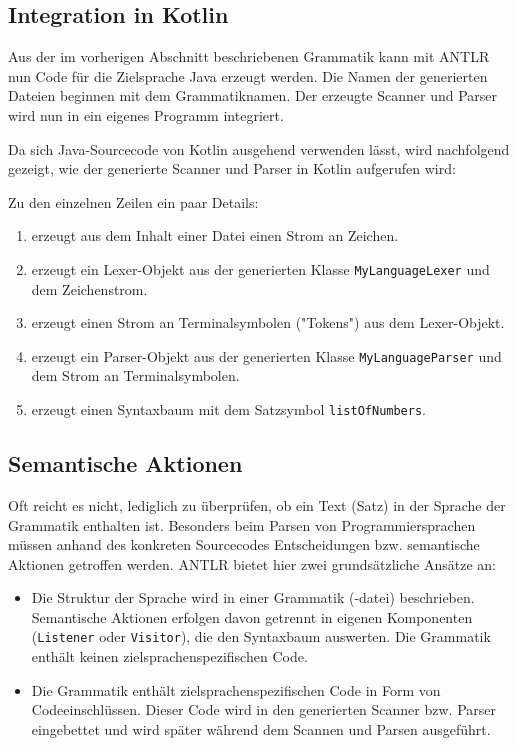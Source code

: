\subsection{Integration in Kotlin}

Aus der im vorherigen Abschnitt beschriebenen Grammatik kann mit ANTLR nun Code für die Zielsprache Java erzeugt werden. Die Namen der generierten Dateien beginnen mit dem Grammatiknamen. Der erzeugte Scanner und Parser wird nun in ein eigenes Programm integriert.

Da sich Java-Sourcecode von Kotlin ausgehend verwenden lässt, wird nachfolgend gezeigt, wie der generierte Scanner und Parser in Kotlin aufgerufen wird:



Zu den einzelnen Zeilen ein paar Details:
\begin{enumerate}
    \item erzeugt aus dem Inhalt einer Datei einen Strom an Zeichen.
    \item erzeugt ein Lexer-Objekt aus der generierten Klasse \lstinline{MyLanguageLexer} und dem Zeichenstrom.
    \item erzeugt einen Strom an Terminalsymbolen ("Tokens") aus dem Lexer-Objekt.
    \item erzeugt ein Parser-Objekt aus der generierten Klasse \lstinline{MyLanguageParser} und dem Strom an Terminalsymbolen.
    \item erzeugt einen Syntaxbaum mit dem Satzsymbol \lstinline{listOfNumbers}.
\end{enumerate}

\subsection{Semantische Aktionen}

Oft reicht es nicht, lediglich zu überprüfen, ob ein Text (Satz) in der Sprache der Grammatik enthalten ist. Besonders beim Parsen von Programmiersprachen müssen anhand des konkreten Sourcecodes Entscheidungen bzw. semantische Aktionen getroffen werden. ANTLR bietet hier zwei grundsätzliche Ansätze an:

\begin{itemize}
    \item Die Struktur der Sprache wird in einer Grammatik (-datei) beschrieben. Semantische Aktionen erfolgen davon getrennt in eigenen Komponenten (\lstinline{Listener} oder \lstinline{Visitor}), die den Syntaxbaum auswerten. Die Grammatik enthält keinen zielsprachenspezifischen Code.
    \item Die Grammatik enthält zielsprachenspezifischen Code in Form von Codeeinschlüssen. Dieser Code wird in den generierten Scanner bzw. Parser eingebettet und wird später während dem Scannen und Parsen ausgeführt. 
\end{itemize}

